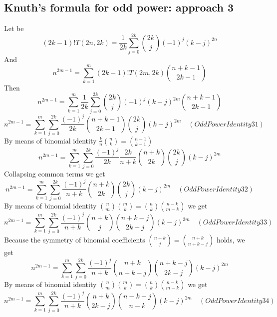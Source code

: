 \subsection{Knuth's formula for odd power: approach 3}\label{subsec:knuth's-formula-for-odd-power-approach-3}
Let be
\begin{equation*}
(2k-1)
    !T(2n, 2k) = \frac{1}{2k} \sum_{j=0}^{2k} \binom{2k}{j} (-1)^{j} (k-j)^{2n}
\end{equation*}
And
\begin{equation*}
    n^{2m-1} = \sum_{k=1}^{m} (2k-1)! T(2m,2k) \binom{n+k-1}{2k-1}
\end{equation*}
Then
\begin{equation*}
    n^{2m-1} = \sum_{k=1}^{m} \frac{1}{2k} \sum_{j=0}^{2k} \binom{2k}{j} (-1)^{j} (k-j)^{2m} \binom{n+k-1}{2k-1}
\end{equation*}
\begin{equation*}
    n^{2m-1} = \sum_{k=1}^{m} \sum_{j=0}^{2k} \frac{(-1)^{j}}{2k} \binom{n+k-1}{2k-1} \binom{2k}{j} (k-j)^{2m} \quad
    (OddPowerIdentity31)
\end{equation*}
By means of binomial identity $\frac{k}{n} \binom{n}{k} = \binom{n-1}{k-1}$
\begin{equation*}
    n^{2m-1} = \sum_{k=1}^{m} \sum_{j=0}^{2k} \frac{(-1)^{j}}{2k} \frac{2k}{n+k} \binom{n+k}{2k} \binom{2k}{j} (k-j)^{2m}
\end{equation*}
Collapsing common terms we get
\begin{equation*}
    n^{2m-1} = \sum_{k=1}^{m} \sum_{j=0}^{2k} \frac{(-1)^{j}}{n+k} \binom{n+k}{2k} \binom{2k}{j} (k-j)^{2m} \quad
    (OddPowerIdentity32)
\end{equation*}
By means of binomial identity $\binom{n}{m} \binom{m}{k} = \binom{n}{k} \binom{n-k}{m-k}$ we get
\begin{equation*}
    n^{2m-1} = \sum_{k=1}^{m} \sum_{j=0}^{2k} \frac{(-1)^{j}}{n+k} \binom{n+k}{j} \binom{n+k-j}{2k-j} (k-j)^{2m} \quad
    (OddPowerIdentity33)
\end{equation*}
Because the symmetry of binomial coefficients $\binom{n+k}{j} = \binom{n+k}{n+k-j}$ holds, we get
\begin{equation*}
    n^{2m-1} = \sum_{k=1}^{m} \sum_{j=0}^{2k} \frac{(-1)^{j}}{n+k} \binom{n+k}{n+k-j} \binom{n+k-j}{2k-j} (k-j)^{2m}
\end{equation*}
By means of binomial identity $\binom{n}{m} \binom{m}{k} = \binom{n}{k} \binom{n-k}{m-k}$ we get
\begin{equation*}
    n^{2m-1} = \sum_{k=1}^{m} \sum_{j=0}^{2k} \frac{(-1)^{j}}{n+k} \binom{n+k}{2k-j} \binom{n-k+j}{n-k} (k-j)^{2m} \quad
    (OddPowerIdentity34)
\end{equation*}